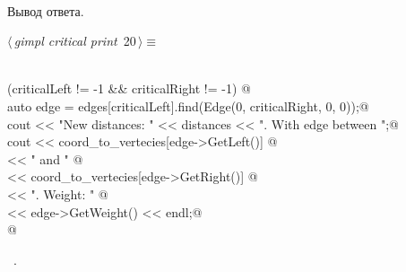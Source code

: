 \documentclass[12pt]{article}
\begin{document}
\paragraph{}
Вывод ответа.
\begin{flushleft} \small
\begin{minipage}{\linewidth}\label{scrap34}\raggedright\small
{} $\langle\,${\itshape gimpl critical print}\nobreak\ {\footnotesize {20}}$\,\rangle\equiv$
\vspace{-1ex}
\begin{list}{}{} \item
\mbox{}\verb@@\\
\mbox{}\verb@if (criticalLeft != -1 && criticalRight != -1) {@\\
\mbox{}\verb@    auto edge = edges[criticalLeft].find(Edge(0, criticalRight, 0, 0));@\\
\mbox{}\verb@    cout << "New distances: " << distances << ". With edge between ";@\\
\mbox{}\verb@    cout << coord_to_vertecies[edge->GetLeft()] @\\
\mbox{}\verb@      << " and " @\\
\mbox{}\verb@      << coord_to_vertecies[edge->GetRight()] @\\
\mbox{}\verb@      << ". Weight: " @\\
\mbox{}\verb@      << edge->GetWeight() << endl;@\\
\mbox{}\verb@} @\\
\mbox{}\verb@@{\NWsep}
\end{list}
\vspace{-1.5ex}
\footnotesize
\begin{list}{}{\setlength{\itemsep}{-\parsep}\setlength{\itemindent}{-\leftmargin}}
\item \NWtxtMacroRefIn\ .

\item{}
\end{list}
\end{minipage}\vspace{4ex}
\end{flushleft}
\end{document}
